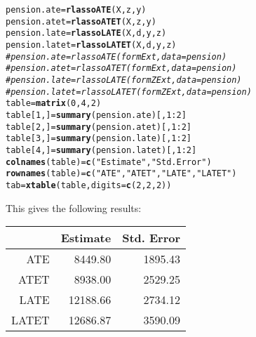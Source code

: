 \documentclass{amsart}\usepackage[]{graphicx}\usepackage[]{color}
\makeatletter
\newcommand{\hlnum}[1]{\textcolor[rgb]{0.686,0.059,0.569}{#1}}%
\newcommand{\hlstr}[1]{\textcolor[rgb]{0.192,0.494,0.8}{#1}}%
\newcommand{\hlcom}[1]{\textcolor[rgb]{0.678,0.584,0.686}{\textit{#1}}}%
\newcommand{\hlopt}[1]{\textcolor[rgb]{0,0,0}{#1}}%
\newcommand{\hlstd}[1]{\textcolor[rgb]{0.345,0.345,0.345}{#1}}%
\newcommand{\hlkwb}[1]{\textcolor[rgb]{0.69,0.353,0.396}{#1}}%
\newcommand{\hlkwc}[1]{\textcolor[rgb]{0.333,0.667,0.333}{#1}}%
\newcommand{\hlkwd}[1]{\textcolor[rgb]{0.737,0.353,0.396}{\textbf{#1}}}%
\newenvironment{kframe}{%
 \def\at@end@of@kframe{}%
 \ifinner\ifhmode%
  \def\at@end@of@kframe{\end{minipage}}%
  \begin{minipage}{\columnwidth}%
 \fi\fi%
 \def\FrameCommand##1{\hskip\@totalleftmargin \hskip-\fboxsep
 \colorbox{shadecolor}{##1}\hskip-\fboxsep
     \hskip-\linewidth \hskip-\@totalleftmargin \hskip\columnwidth}%
 \MakeFramed {\advance\hsize-\width
   \@totalleftmargin\z@ \linewidth\hsize
   \@setminipage}}%
 {\par\unskip\endMakeFramed%
 \at@end@of@kframe}
\newenvironment{knitrout}{}{} %
\makeatother
\begin{document}
\begin{knitrout}
\color{fgcolor}\begin{kframe}
\begin{alltt}
\hlstd{pension.ate} \hlkwb{=} \hlkwd{rlassoATE}\hlstd{(X, z, y)}
\hlstd{pension.atet} \hlkwb{=} \hlkwd{rlassoATET}\hlstd{(X, z, y)}
\hlstd{pension.late} \hlkwb{=} \hlkwd{rlassoLATE}\hlstd{(X, d, y, z)}
\hlstd{pension.latet} \hlkwb{=} \hlkwd{rlassoLATET}\hlstd{(X, d, y, z)}
\hlcom{# pension.ate = rlassoATE(formExt, data = pension)}
\hlcom{# pension.atet = rlassoATET(formExt, data = pension)}
\hlcom{# pension.late = rlassoLATE(formZExt, data = pension)}
\hlcom{# pension.latet = rlassoLATET(formZExt, data = pension)}
\hlstd{table} \hlkwb{=} \hlkwd{matrix}\hlstd{(}\hlnum{0}\hlstd{,} \hlnum{4}\hlstd{,} \hlnum{2}\hlstd{)}
\hlstd{table[}\hlnum{1}\hlstd{, ]} \hlkwb{=} \hlkwd{summary}\hlstd{(pension.ate)[,} \hlnum{1}\hlopt{:}\hlnum{2}\hlstd{]}
\hlstd{table[}\hlnum{2}\hlstd{, ]} \hlkwb{=} \hlkwd{summary}\hlstd{(pension.atet)[,} \hlnum{1}\hlopt{:}\hlnum{2}\hlstd{]}
\hlstd{table[}\hlnum{3}\hlstd{, ]} \hlkwb{=} \hlkwd{summary}\hlstd{(pension.late)[,} \hlnum{1}\hlopt{:}\hlnum{2}\hlstd{]}
\hlstd{table[}\hlnum{4}\hlstd{, ]} \hlkwb{=} \hlkwd{summary}\hlstd{(pension.latet)[,} \hlnum{1}\hlopt{:}\hlnum{2}\hlstd{]}
\hlkwd{colnames}\hlstd{(table)} \hlkwb{=} \hlkwd{c}\hlstd{(}\hlstr{"Estimate"}\hlstd{,} \hlstr{"Std. Error"}\hlstd{)}
\hlkwd{rownames}\hlstd{(table)} \hlkwb{=} \hlkwd{c}\hlstd{(}\hlstr{"ATE"}\hlstd{,} \hlstr{"ATET "}\hlstd{,} \hlstr{"LATE"}\hlstd{,} \hlstr{"LATET"}\hlstd{)}
\hlstd{tab} \hlkwb{=} \hlkwd{xtable}\hlstd{(table,} \hlkwc{digits} \hlstd{=} \hlkwd{c}\hlstd{(}\hlnum{2}\hlstd{,} \hlnum{2}\hlstd{,} \hlnum{2}\hlstd{))}
\end{alltt}
\end{kframe}
\end{knitrout}

This gives the following results:

\begin{table}[ht]
\centering
\begin{tabular}{rrr}
  \hline
 & Estimate & Std. Error \\ 
  \hline
ATE & 8449.80 & 1895.43 \\ 
  ATET  & 8938.00 & 2529.25 \\ 
  LATE & 12188.66 & 2734.12 \\ 
  LATET & 12686.87 & 3590.09 \\ 
   \hline
\end{tabular}
\end{table}
\end{document}
